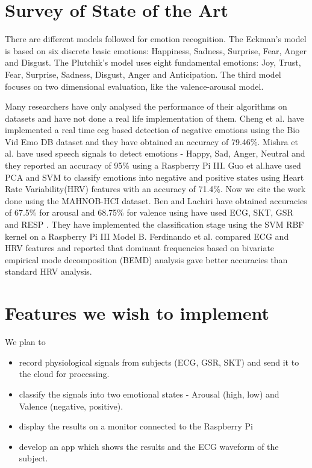 \documentclass[11pt]{article}
\theoremstyle{definition}
\begin{document}
  \section{Survey of State of the Art}
    There are different models followed for emotion recognition. 
    The Eckman's model is based on six discrete basic emotions: Happiness, Sadness, Surprise, Fear, Anger and Disgust\cite{ekman_universals_1987}. 
    The Plutchik's model uses eight fundamental emotions: Joy, Trust, Fear, Surprise, Sadness, Disgust, Anger and Anticipation\cite{plutchik_nature_2001}. 
    The third model\cite{russell_evidence_1977} focuses on two dimensional evaluation, like the valence-arousal model\cite{soleymani_multimodal_2012}.

    Many researchers have only analysed the performance of their algorithms on datasets and have not done a real life implementation of them.
    Cheng et al.\cite{cheng_novel_2017} have implemented a real time ecg based detection of negative emotions using the Bio Vid Emo DB dataset and they have obtained an accuracy of 79.46\%. 
    Mishra et al.\cite{mishra_real_2017} have used speech signals to detect emotions - Happy, Sad, Anger, Neutral and they reported an accuracy of 95\% using a Raspberry Pi III.
    Guo et al.\cite{guo_heart_2016}have used PCA and SVM to classify emotions into negative and positive states using Heart Rate Variability(HRV) features with an accuracy of 71.4\%.
    Now we cite the work done using the MAHNOB-HCI dataset\cite{soleymani_multimodal_2012}. 
    Ben and Lachiri\cite{ben_emotion_2017} have obtained accuracies of 67.5\% for arousal and 68.75\% for valence using have used ECG, SKT, GSR and RESP . They have implemented the classification stage using the SVM RBF kernel on a Raspberry Pi III Model B.
    Ferdinando et al.\cite{ferdinando_comparing_2016} compared ECG and HRV features and reported that dominant frequencies based on
    bivariate empirical mode decomposition (BEMD) analysis gave better accuracies than standard HRV analysis.
   
  \newpage
  \section{Features we wish to implement}
    We plan to 
    \begin{itemize}
      \item record physiological signals from subjects (ECG, GSR, SKT) and send it to the cloud for processing.
      \item classify the signals into two emotional states - Arousal (high, low) and Valence (negative, positive)\cite{ben_emotion_2017}.
      \item display the results on a monitor connected to the Raspberry Pi
      \item develop an app which shows the results and the ECG waveform of the subject.
    \end{itemize}
\end{document}

